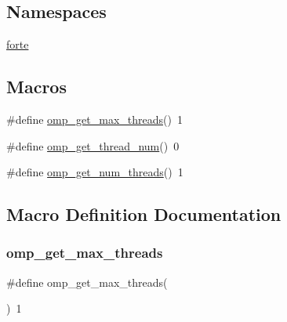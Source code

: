 \subsection*{Namespaces}
\begin{DoxyCompactItemize}
\item 
 \mbox{\hyperlink{namespaceforte}{forte}}
\end{DoxyCompactItemize}
\subsection*{Macros}
\begin{DoxyCompactItemize}
\item 
\#define \mbox{\hyperlink{mrci-no_8cc_a59e73060d1552ccda56039c7f3d25a84}{omp\+\_\+get\+\_\+max\+\_\+threads}}()~1
\item 
\#define \mbox{\hyperlink{mrci-no_8cc_a889ec205c635b219999c761b28cc39ba}{omp\+\_\+get\+\_\+thread\+\_\+num}}()~0
\item 
\#define \mbox{\hyperlink{mrci-no_8cc_a4353281743925f182316dba7cda58fee}{omp\+\_\+get\+\_\+num\+\_\+threads}}()~1
\end{DoxyCompactItemize}


\subsection{Macro Definition Documentation}
\mbox{\label{mrci-no_8cc_a59e73060d1552ccda56039c7f3d25a84}} 
\subsubsection{\texorpdfstring{omp\+\_\+get\+\_\+max\+\_\+threads}{omp\_get\_max\_threads}}
{\footnotesize\ttfamily \#define omp\+\_\+get\+\_\+max\+\_\+threads(\begin{DoxyParamCaption}{ }\end{DoxyParamCaption})~1}

\mbox{\label{mrci-no_8cc_a4353281743925f182316dba7cda58fee}} 
